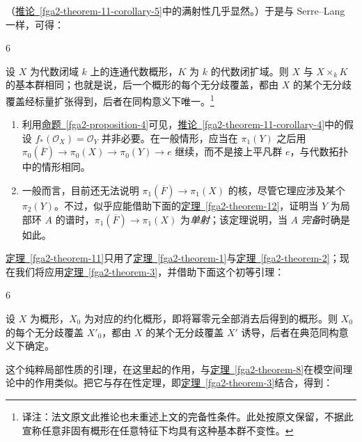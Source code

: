 \par{}（\hyperref[fga2-theorem-11-corollary-5]{推论~\ref*{fga2-theorem-11-corollary-5}}中的满射性几乎显然。）于是与 Serre–Lang 一样，可得：
\begin{corollary}{6}\label{fga2-theorem-11-corollary-6}\skipsinglepar
\par{}设 \(X\) 为代数闭域 \(k\) 上的连通代数概形，\(K\) 为 \(k\) 的代数闭扩域。则 \(X\) 与 \(X\times _kK\) 的基本群相同；也就是说，后一个概形的每个无分歧覆盖，都由 \(X\) 的某个无分歧覆盖经标量扩张得到，后者在同构意义下唯一。\footnote{译注：法文原文此推论也未重述上文的完备性条件。此处按原文保留，不据此宣称任意非固有概形在任意特征下均具有这种基本群不变性。}\end{corollary}
\begin{remarks}{}\label{fga2-8-remarks-i}\skipsinglepar
\begin{enumerate}\item{}利用\hyperref[fga2-proposition-4]{命题~\ref*{fga2-proposition-4}}可见，\hyperref[fga2-theorem-11-corollary-4]{推论~\ref*{fga2-theorem-11-corollary-4}}中的假设 \(f_*(\mathcal {O}_X)=\mathcal {O}_Y\) 并非必要。在一般情形，应当在 \(\pi _1(Y)\) 之后用 \(\pi _0(\overline {F})\to \pi _0(X)\to \pi _0(Y)\to  e\) 继续，而不是接上平凡群 \(e\)，与代数拓扑中的情形相同。

    \item{}一般而言，目前还无法说明 \(\pi _1(\overline {F})\to \pi _1(X)\) 的核，尽管它理应涉及某个 \(\pi _2(Y)\)。不过，似乎应能借助下面的\hyperref[fga2-theorem-12]{定理~\ref*{fga2-theorem-12}}，证明当 \(Y\) 为局部环 \(A\) 的谱时，\(\pi _1(\overline {F})\to \pi _1(X)\) 为\emph{单射}；该定理说明，当 \(A\) \emph{完备}时确是如此。\end{enumerate}\end{remarks}
\par{}\hyperref[fga2-theorem-11]{定理~\ref*{fga2-theorem-11}}只用了\hyperref[fga2-theorem-1]{定理~\ref*{fga2-theorem-1}}与\hyperref[fga2-theorem-2]{定理~\ref*{fga2-theorem-2}}；现在我们将应用\hyperref[fga2-theorem-3]{定理~\ref*{fga2-theorem-3}}，并借助下面这个初等引理：
\begin{lemma}{6}\label{fga2-lemma-6}\skipsinglepar
\par{}设 \(X\) 为概形，\(X_0\) 为对应的约化概形，即将幂零元全部消去后得到的概形。则 \(X_0\) 的每个无分歧覆盖 \(X'_0\)，都由 \(X\) 的某个无分歧覆盖 \(X'\) 诱导，后者在典范同构意义下确定。\end{lemma}
\par{}这个纯粹局部性质的引理，在这里起的作用，与\hyperref[fga2-theorem-8]{定理~\ref*{fga2-theorem-8}}在模空间理论中的作用类似。把它与存在性定理，即\hyperref[fga2-theorem-3]{定理~\ref*{fga2-theorem-3}}结合，得到：
